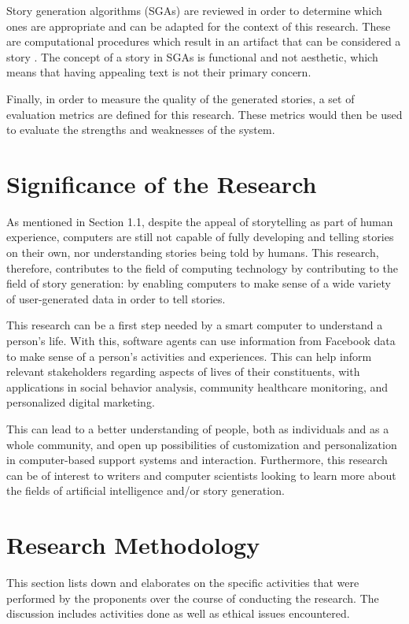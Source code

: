 Story generation algorithms (SGAs) are reviewed in order to determine which ones are appropriate and can be adapted for the context of this research. These are computational procedures which result in an artifact that can be considered a story \cite{Gervas2012}. The concept of a story in SGAs is functional and not aesthetic, which means that having appealing text is not their primary concern. 

Finally, in order to measure the quality of the generated stories, a set of evaluation metrics are defined for this research. These metrics would then be used to evaluate the strengths and weaknesses of the system.

\section{Significance of the Research}
\label{sec:significance}

As mentioned in Section 1.1, despite the appeal of storytelling as part of human experience, computers are still not capable of fully developing and telling stories on their own, nor understanding stories being told by humans. This research, therefore, contributes to the field of computing technology by contributing to the field of story generation: by enabling computers to make sense of a wide variety of user-generated data in order to tell stories.

This research can be a first step needed by a smart computer to understand a person's life. With this, software agents can use information from Facebook data to make sense of a person's activities and experiences. This can help inform relevant stakeholders regarding aspects of lives of their constituents, with applications in social behavior analysis, community healthcare monitoring, and personalized digital marketing. 

This can lead to a better understanding of people, both as individuals and as a whole community, and open up possibilities of customization and personalization in computer-based support systems and interaction. Furthermore, this research can be of interest to writers and computer scientists looking to learn more about the fields of artificial intelligence and/or story generation.

\section{Research Methodology}
\label{sec:methodology}
This section lists down and elaborates on the specific activities that were performed by the proponents over the course of conducting the research. The discussion includes activities done as well as ethical issues encountered.

